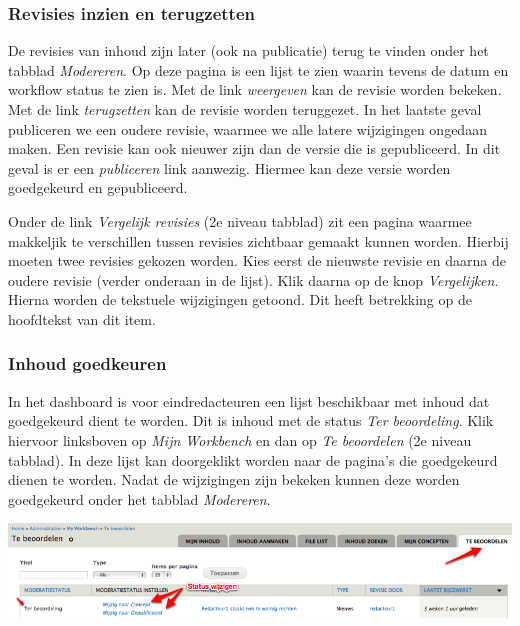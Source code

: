 \subsubsection{Revisies inzien en terugzetten}\label{modererentab}

De revisies van inhoud zijn later (ook na publicatie) terug te vinden onder het tabblad \emph{Modereren}. Op deze pagina is een lijst te zien waarin tevens de datum en workflow status te zien is. Met de link \emph{weergeven} kan de revisie worden bekeken. Met de link \emph{terugzetten} kan de revisie worden teruggezet. In het laatste geval publiceren we een oudere revisie, waarmee we alle latere wijzigingen ongedaan maken. Een revisie kan ook nieuwer zijn dan de versie die is gepubliceerd. In dit geval is er een \emph{publiceren} link aanwezig. Hiermee kan deze versie worden goedgekeurd en gepubliceerd.

Onder de link \emph{Vergelijk revisies} (2e niveau tabblad) zit een pagina waarmee makkeljik te verschillen tussen revisies zichtbaar gemaakt kunnen worden. Hierbij moeten twee revisies gekozen worden. Kies eerst de nieuwste revisie en daarna de oudere revisie (verder onderaan in de lijst). Klik daarna op de knop \emph{Vergelijken}. Hierna worden de tekstuele wijzigingen getoond. Dit heeft betrekking op de hoofdtekst van dit item.

\subsubsection{Inhoud goedkeuren}\label{inhoudgoedkeuren}

In het dashboard is voor eindredacteuren een lijst beschikbaar met inhoud dat goedgekeurd dient te worden. Dit is inhoud met de status \emph{Ter beoordeling}. Klik hiervoor linksboven op \emph{Mijn Workbench} en dan op \emph{Te beoordelen} (2e niveau tabblad). In deze lijst kan doorgeklikt worden naar de pagina's die goedgekeurd dienen te worden. Nadat de wijzigingen zijn bekeken kunnen deze worden goedgekeurd onder het tabblad \emph{Modereren}.

\begin{center}
\includegraphics[width=\textwidth]{img/publiceren.png}
\end{center}